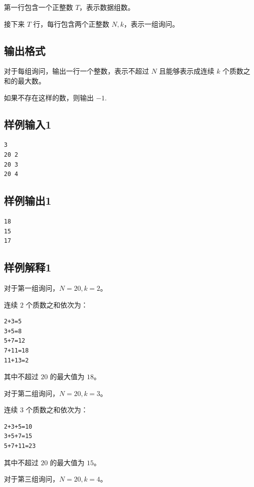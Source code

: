 第一行包含一个正整数 $T$，表示数据组数。

接下来 $T$ 行，每行包含两个正整数 $N,k$，表示一组询问。

\subsection{输出格式}

对于每组询问，输出一行一个整数，表示不超过 $N$ 且能够表示成连续 $k$ 个质数之和的最大数。

如果不存在这样的数，则输出 $-1$.

\subsection{样例输入1}

\begin{lstlisting}
3
20 2
20 3
20 4
\end{lstlisting}

\subsection{样例输出1}

\begin{lstlisting}
18
15
17
\end{lstlisting}

\subsection{样例解释1}

对于第一组询问，$N=20,k=2$。

连续 $2$ 个质数之和依次为：

\begin{lstlisting}
2+3=5
3+5=8
5+7=12
7+11=18
11+13=2
\end{lstlisting}

其中不超过 $20$ 的最大值为 $18$。

对于第二组询问，$N=20,k=3$。

连续 $3$ 个质数之和依次为：

\begin{lstlisting}
2+3+5=10
3+5+7=15
5+7+11=23
\end{lstlisting}

其中不超过 $20$ 的最大值为 $15$。

对于第三组询问，$N=20,k=4$。

